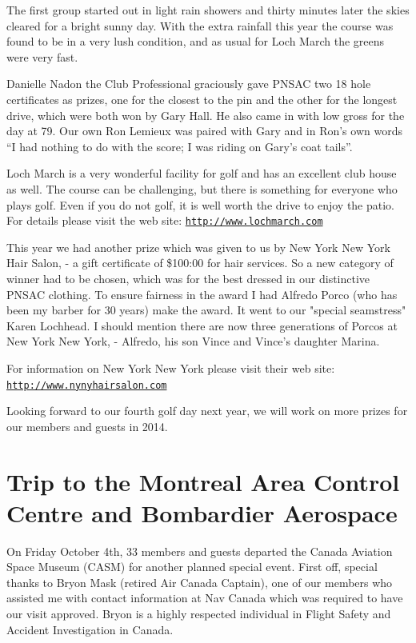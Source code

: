 The first group started out in light rain showers and thirty minutes
later the skies cleared for a bright sunny day. With the extra
rainfall this year the course was found to be in a very lush
condition, and as usual for Loch March the greens were very fast.

Danielle Nadon the Club Professional graciously gave PNSAC two 18 hole
certificates as prizes, one for the closest to the pin and the other
for the longest drive, which were both won by Gary Hall. He also came
in with low gross for the day at 79. Our own Ron Lemieux was paired
with Gary and in Ron's own words ``I had nothing to do with the score;
I was riding on Gary's coat tails''.

Loch March is a very wonderful facility for golf and has an excellent
club house as well. The course can be challenging, but there is
something for everyone who plays golf. Even if you do not golf, it is
well worth the drive to enjoy the patio. For details please visit the
web site: {\normalfont\color{blue}\texttt{\url{http://www.lochmarch.com}}}

This year we had another prize which was given to us by New York New
York Hair Salon, - a gift certificate of \$100:00 for hair
services. So a new category of winner had to be chosen, which was for
the best dressed in our distinctive PNSAC clothing. To ensure fairness
in the award I had Alfredo Porco (who has been my barber for 30 years)
make the award. It went to our "special seamstress" Karen Lochhead.  I
should mention there are now three generations of Porcos at New York
New York, - Alfredo, his son Vince and Vince's daughter Marina.

For information on New York New York please visit their web site:
 {\normalfont\color{blue}\texttt{\url{http://www.nynyhairsalon.com}}}

Looking forward to our fourth golf day next year, we will work on more
prizes for our members and guests in 2014.

\section{Trip to the Montreal Area Control Centre and Bombardier Aerospace}
\label{yultrip}

On Friday October 4th, 33 members and guests departed the Canada
Aviation Space Museum (CASM) for another planned special event. First
off, special thanks to Bryon Mask (retired Air Canada Captain), one of
our members who assisted me with contact information at Nav Canada
which was required to have our visit approved. Bryon is a highly
respected individual in Flight Safety and Accident Investigation in
Canada.

